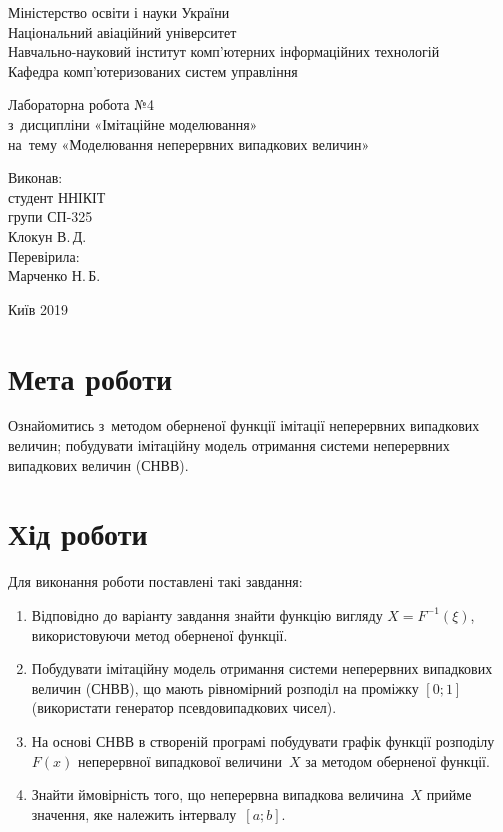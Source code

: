 \documentclass[
	a4paper,
	oneside,
	BCOR = 10mm,
	DIV = 12,
	12pt,
	headings = normal,
]{scrartcl}
\newcommand{\allcaps}[1]{{\addfontfeatures{LetterSpace = 8, Kerning = Off}#1}}
\begin{document}
\begin{titlepage}
		\begin{center}
			Міністерство освіти і науки України\\
			Національний авіаційний університет\\
			Навчально-науковий інститут комп'ютерних інформаційних технологій\\
			Кафедра комп'ютеризованих систем управління

			\vspace{\fill}
				Лабораторна робота №4\\
				з~дисципліни «Імітаційне моделювання»\\
				на~тему «Моделювання неперервних випадкових величин»\\

			\vspace{\fill}

			\begin{flushright}
				Виконав:\\
				студент \allcaps{ННІКІТ}\\
				групи СП-325\\
				Клокун В.\,Д.\\
				Перевірила:\\
				Марченко Н.\,Б.
			\end{flushright}

			Київ 2019
		\end{center}
	\end{titlepage}

	\section{Мета роботи}
		Ознайомитись з~методом оберненої функції імітації неперервних випадкових величин; побудувати імітаційну модель отримання системи неперервних випадкових величин (СНВВ).

	\section{Хід роботи}
		Для виконання роботи поставлені такі завдання:
		\begin{enumerate}
			\item Відповідно до варіанту завдання знайти функцію вигляду $X = F^{-1}(\xi)$, використовуючи метод оберненої функції.
			\item Побудувати імітаційну модель отримання системи неперервних випадкових величин (СНВВ), що мають рівномірний розподіл на проміжку $[0; 1]$ (використати генератор псевдовипадкових чисел).
			\item На основі СНВВ в створеній програмі побудувати графік функції розподілу~$F(x)$ неперервної випадкової величини~$X$ за методом оберненої функції.
			\item Знайти ймовірність того, що неперервна випадкова величина~$X$ прийме значення, яке належить інтервалу~$[a; b]$.
		\end{enumerate}
\end{document}
